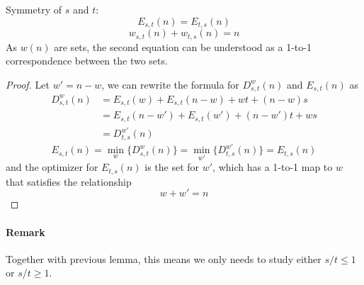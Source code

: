 \documentclass[]{article}
\begin{document}
\vspace{1cm}
\begin{lemma}[Symmetry] Symmetry of $s$ and $t$:
	\[
		E_{s,t}(n) = E_{t,s}(n)
	\]
	\[
		w_{s,t}(n) + w_{t,s}(n) = n
	\]
As $w(n)$ are sets, the second equation can be understood as a 1-to-1 correspondence between the two sets.
\end{lemma}
\begin{proof}
	Let $w' = n - w$, we can rewrite the formula for $D^w_{s,t}(n)$ and $E_{s,t}(n)$ as
	\begin{align*}
	D^w_{s,t}(n) &= E_{s,t}(w) + E_{s,t}(n-w) + wt +(n-w)s\\
	&= E_{s,t}(n-w') + E_{s,t}(w') + (n-w')t +ws\\
	&=D^{w'}_{t,s}(n)
	\end{align*}
	\[
	E_{s,t}(n) = \min_w\{D^w_{s,t}(n)\} = \min_{w'}\{D^{w'}_{t,s}(n)\} = E_{t,s}(n)
	\]
	and the optimizer for $E_{t,s}(n)$ is the set for $w'$, which has a 1-to-1 map to $w$ that satisfies the relationship
	\[
	w + w' = n
	\]
\end{proof}	
\paragraph{Remark}
 Together with previous lemma, this means we only needs to study either $s/t \le1$ or $s/t \ge 1$.  
\end{document}
